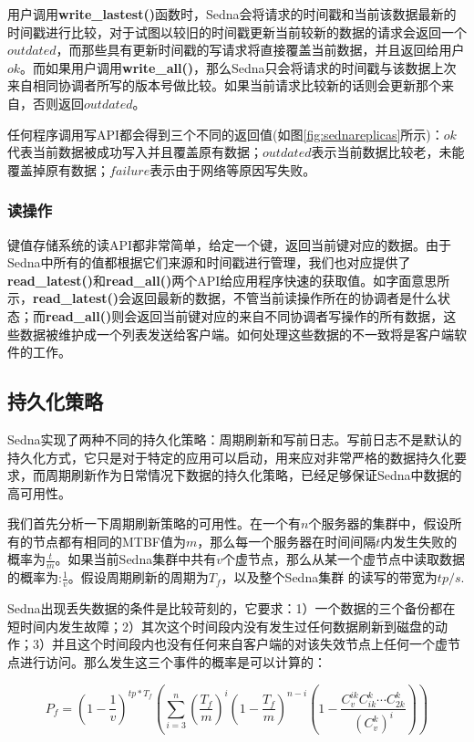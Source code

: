 用户调用\textbf{write\_lastest()}函数时，Sedna会将请求的时间戳和当前该数据最新的时间戳进行比较，对于试图以较旧的时间戳更新当前较新的数据的请求会返回一个$outdated$，而那些具有更新时间戳的写请求将直接覆盖当前数据，并且返回给用户$ok$。而如果用户调用\textbf{write\_all()}，那么Sedna只会将请求的时间戳与该数据上次来自相同协调者所写的版本号做比较。如果当前请求比较新的话则会更新那个来自，否则返回$outdated$。

任何程序调用写API都会得到三个不同的返回值(如图\ref{fig:sednareplicas}所示)：$ok$代表当前数据被成功写入并且覆盖原有数据；$outdated$表示当前数据比较老，未能覆盖掉原有数据；$failure$表示由于网络等原因写失败。

\subsubsection{读操作}
键值存储系统的读API都非常简单，给定一个键，返回当前键对应的数据。由于Sedna中所有的值都根据它们来源和时间戳进行管理，我们也对应提供了\textbf{read\_latest()}和\textbf{read\_all()}两个API给应用程序快速的获取值。如字面意思所示，\textbf{read\_latest()}会返回最新的数据，不管当前读操作所在的协调者是什么状态；而\textbf{read\_all()}则会返回当前键对应的来自不同协调者写操作的所有数据，这些数据被维护成一个列表发送给客户端。如何处理这些数据的不一致将是客户端软件的工作。

\subsection{持久化策略}

Sedna实现了两种不同的持久化策略：周期刷新和写前日志。写前日志不是默认的持久化方式，它只是对于特定的应用可以启动，用来应对非常严格的数据持久化要求，而周期刷新作为日常情况下数据的持久化策略，已经足够保证Sedna中数据的高可用性。

我们首先分析一下周期刷新策略的可用性。在一个有$n$个服务器的集群中，假设所有的节点都有相同的MTBF\cite{mtbf}值为$m$，那么每一个服务器在时间间隔$t$内发生失败的概率为$\frac{t}{m}$。如果当前Sedna集群中共有$v$个虚节点，那么从某一个虚节点中读取数据的概率为:$\frac{1}{v}$。假设周期刷新的周期为$T_{f}$，以及整个Sedna集群
的读写的带宽为$tp/s$.

Sedna出现丢失数据的条件是比较苛刻的，它要求：1）一个数据的三个备份都在短时间内发生故障；2）其次这个时间段内没有发生过任何数据刷新到磁盘的动作；3）并且这个时间段内也没有任何来自客户端的对该失效节点上任何一个虚节点进行访问。那么发生这三个事件的概率是可以计算的：

\begin{displaymath}
P_{f} = (1 - \frac{1}{v})^{tp* T_{f}}(\sum_{i=3}^{n}  (\frac{T_{f}}{m})^{i} (1- \frac{T_{f}}{m})^{n-i} ( 1 - \frac{C_{v}^{ik} C_{ik}^{k}\cdots C_{2k}^{k}}{(C_{v}^{k})^{i}}))
\end{displaymath}

